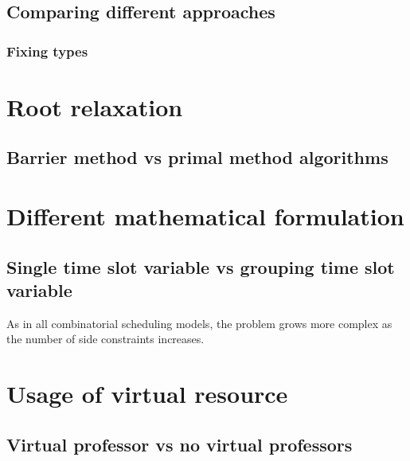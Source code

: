 
\subsection{Comparing different approaches}

\subsubsection{Fixing types}




\section{Root relaxation}

\subsection{Barrier method vs primal method algorithms}




\section{Different mathematical formulation}

\subsection{Single time slot variable vs grouping time slot variable}



As in all combinatorial scheduling models, the problem grows more complex as the number of side constraints increases.



\section{Usage of virtual resource}

\subsection{Virtual professor vs no virtual professors}

